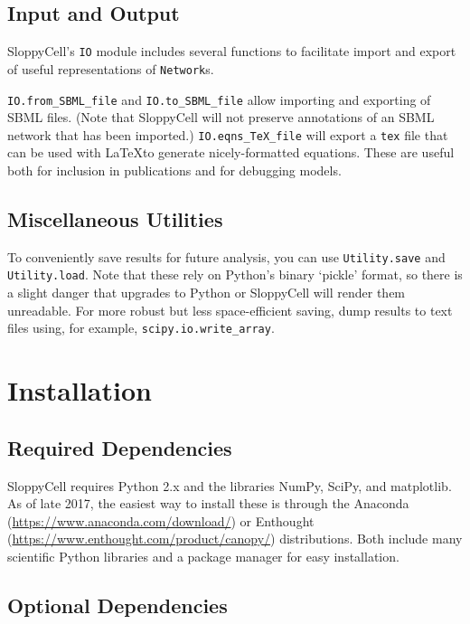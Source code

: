 \documentclass[12pt]{article}
\makeatletter
\newcommand{\py}[1]{\lstinline[language=Python, showstringspaces=False]@#1@}
\newcommand{\shell}[1]{\lstinline[language=csh, showstringspaces=False]!#1!}
\makeatother
\begin{document}
\subsection{Input and Output \label{sec:user:IO}}

SloppyCell's \py{IO} module includes several functions to facilitate import and export of useful representations of \py{Network}s.

\py{IO.from_SBML_file} and \py{IO.to_SBML_file} allow importing and exporting of SBML files. (Note that SloppyCell will not preserve annotations of an SBML network that has been imported.)
\py{IO.eqns_TeX_file} will export a \shell{tex} file that can be used with \LaTeX to generate nicely-formatted equations. These are useful both for inclusion in publications and for debugging models.

\subsection{Miscellaneous Utilities}

To conveniently save results for future analysis, you can use \py{Utility.save} and \py{Utility.load}.
Note that these rely on Python's binary `pickle' format, so there is a slight danger that upgrades to Python or SloppyCell will render them unreadable. For more robust but less space-efficient saving, dump results to text files using, for example, \py{scipy.io.write_array}.


\section{Installation}\label{sec:user:install}

\subsection{Required Dependencies}

SloppyCell requires Python 2.x and the libraries NumPy, SciPy, and matplotlib.
As of late 2017, the easiest way to install these is through the Anaconda (\url{https://www.anaconda.com/download/}) or Enthought (\url{https://www.enthought.com/product/canopy/}) distributions.
Both include many scientific Python libraries and a package manager for easy installation.

\subsection{Optional Dependencies}
\end{document}
